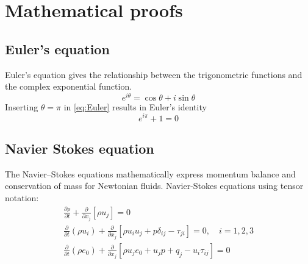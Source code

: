 \chapter{Mathematical proofs}

\section{Euler's equation}
Euler's equation gives the relationship between the trigonometric functions and the complex exponential function.
\begin{equation}
    e^{ i\theta } = \cos \theta + i\sin \theta
    \label{eq:Euler}
\end{equation}
Inserting $\theta=\pi$ in \eqref{eq:Euler} results in Euler's identity
\begin{equation}
    e^{ i \pi} + 1 = 0
    \label{eq:Euler2}
\end{equation}


\section{Navier Stokes equation}

The Navier–Stokes equations mathematically express momentum balance and conservation of mass for Newtonian fluids.  Navier-Stokes equations using tensor notation:
\begin{subequations}
\begin{gather}
    \frac{\partial \rho}{\partial t} +
    \frac{\partial}{\partial x_j}\left[ \rho u_j \right] = 0 
    \\
    \frac{\partial}{\partial t}\left( \rho u_i \right) +
    \frac{\partial}{\partial x_j}
    \left[ \rho u_i u_j + p \delta_{ij} - \tau_{ji} \right] = 0, \quad i=1,2,3
    \\
    \frac{\partial}{\partial t}\left( \rho e_0 \right) +
    \frac{\partial}{\partial x_j}
    \left[ \rho u_j e_0 + u_j p + q_j - u_i \tau_{ij} \right] = 0
\end{gather}
\end{subequations}
